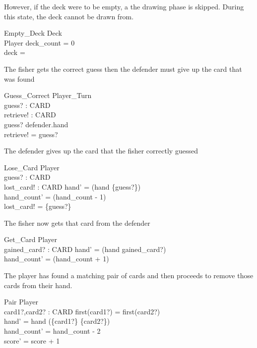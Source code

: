 \documentclass{article}
\begin{document}
However, if the deck were to be empty, a the drawing phase is skipped.
During this state, the deck cannot be drawn from.
\begin{schema}{Empty\_Deck}
    \Xi Deck \\
    \Xi Player
    \where
    deck\_count = 0 \\
    deck = \emptyset
\end{schema}

The fisher gets the correct guess then the defender must
give up the card that was found
\begin{schema}{Guess\_Correct}
    \Xi Player\_Turn \\
    guess? : CARD \\
    retrieve! : CARD\\
    \where
    guess? \in defender.hand \\
    retrieve! = guess?
\end{schema}

The defender gives up the card that the fisher correctly guessed
\begin{schema}{Lose\_Card}
    \Delta Player \\
    guess? : CARD \\
    lost\_card! : \power CARD
    \where
    hand' = (hand \setminus \{guess?\}) \\
    hand\_count' = (hand\_count - 1) \\
    lost\_card! = \{guess?\}
\end{schema}

The fisher now gets that card from the defender
\begin{schema}{Get\_Card}
    \Delta Player \\
    gained\_card? : \power CARD
    \where
    hand' = (hand \cup gained\_card?) \\
    hand\_count' = (hand\_count + 1)
\end{schema}

The player has found a matching pair of cards and then proceeds
to remove those cards from their hand.
\begin{schema}{Pair}
    \Delta Player \\
    card1?,card2? : CARD
    \where
    first(card1?) = first(card2?) \\
    hand' = hand \setminus (\{card1?\} \cup \{card2?\}) \\ 
    hand\_count' = hand\_count - 2 \\
    score' = score + 1
\end{schema}
\end{document}
